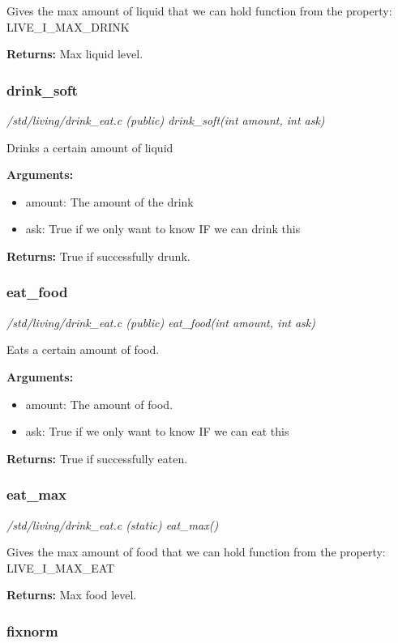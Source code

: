 Gives the max amount of liquid that we can hold
function from the property: LIVE\_I\_MAX\_DRINK

{\bf Returns:}      Max liquid level.


\subsubsection{drink\_soft}

{\em /std/living/drink\_eat.c (public) drink\_soft(int amount, int ask)}

Drinks a certain amount of liquid

{\bf Arguments:}
\begin{itemize}
\item       amount: The amount of the drink
\item ask: True if we only want to know IF we can drink this
\end{itemize}

{\bf Returns:}      True if successfully drunk.


\subsubsection{eat\_food}

{\em /std/living/drink\_eat.c (public) eat\_food(int amount, int ask)}

Eats a certain amount of food.

{\bf Arguments:}
\begin{itemize}
\item       amount: The amount of food.
\item ask: True if we only want to know IF we can eat this
\end{itemize}

{\bf Returns:}      True if successfully eaten.


\subsubsection{eat\_max}

{\em /std/living/drink\_eat.c (static) eat\_max()}

Gives the max amount of food that we can hold
function from the property: LIVE\_I\_MAX\_EAT

{\bf Returns:}      Max food level.


\subsubsection{fixnorm}

